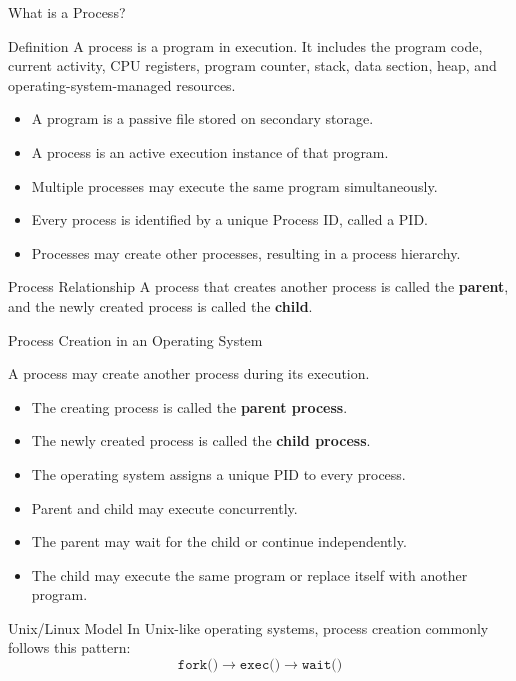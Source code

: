 \documentclass[aspectratio=169]{beamer}
\begin{document}
\begin{frame}{What is a Process?}

\begin{block}{Definition}
A process is a program in execution. It includes the program code, current
activity, CPU registers, program counter, stack, data section, heap, and
operating-system-managed resources.
\end{block}

\begin{itemize}
    \item A program is a passive file stored on secondary storage.
    \item A process is an active execution instance of that program.
    \item Multiple processes may execute the same program simultaneously.
    \item Every process is identified by a unique Process ID, called a PID.
    \item Processes may create other processes, resulting in a process hierarchy.
\end{itemize}

\begin{alertblock}{Process Relationship}
A process that creates another process is called the \textbf{parent}, and the
newly created process is called the \textbf{child}.
\end{alertblock}

\end{frame}

\begin{frame}{Process Creation in an Operating System}

A process may create another process during its execution.

\begin{itemize}
    \item The creating process is called the \textbf{parent process}.
    \item The newly created process is called the \textbf{child process}.
    \item The operating system assigns a unique PID to every process.
    \item Parent and child may execute concurrently.
    \item The parent may wait for the child or continue independently.
    \item The child may execute the same program or replace itself with another
    program.
\end{itemize}

\begin{block}{Unix/Linux Model}
In Unix-like operating systems, process creation commonly follows this pattern:
\[
\texttt{fork()} \longrightarrow \texttt{exec()} \longrightarrow \texttt{wait()}
\]
\end{block}

\end{frame}
\end{document}
